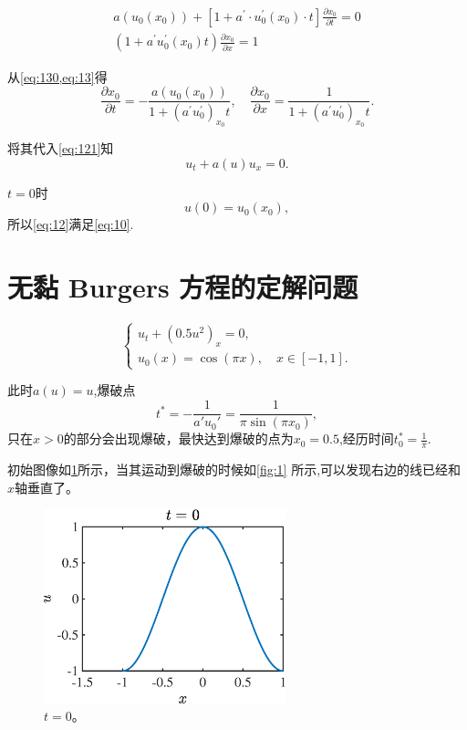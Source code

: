 \documentclass[12pt]{article}
\begin{document}
\begin{gather}
a\left(u_{0}\left(x_{0}\right)\right)+\left[1+a^{\prime} \cdot u_{0}^{\prime}\left(x_{0}\right) \cdot t\right] \frac{\partial x_{0}}{\partial t}=0 
\label{eq:130}
\\
\left(1+a^{\prime} u_{0}^{\prime}\left(x_{0}\right) t\right) \frac{\partial x_{0}}{\partial x}=1
\label{eq:13}
\end{gather}

从\cref{eq:130,eq:13}得
\begin{equation}
	\frac{\partial x_{0}}{\partial t}=-\frac{a\left(u_{0}\left(x_{0}\right)\right)}{1+\left(a^{\prime} u_{0}^{\prime}\right)_{x_{0}} t}, \quad \frac{\partial x_{0}}{\partial x}=\frac{1}{1+\left(a^{\prime} u_{0}^{\prime}\right)_{x_{0}} t}.
\end{equation}

将其代入\cref{eq:121}知
\begin{equation}
	u_{t}+a(u) u_{x}=0.
\end{equation}

$t=0$时
\begin{equation}
	u(0)=u_{0}\left(x_{0}\right),
\end{equation}
所以\cref{eq:12}满足\cref{eq:10}.

\section{无黏 Burgers 方程的定解问题}

\begin{equation}
	\begin{cases}
		u_t+(0.5 u^2)_x=0, \\
		u_0(x) = \cos(\pi x),\quad x \in [-1,1].
	\end{cases}
\end{equation}


此时$a(u)=u$,爆破点
\begin{equation}
	t^* = - \frac{1}{a'u_0'} = \frac{1}{\pi \sin(\pi x_0)},
\end{equation}
只在$x>0$的部分会出现爆破，最快达到爆破的点为$x_0=0.5$,经历时间$t_0^*=\frac{1}{\pi}$.

初始图像如\cref{fig:0}所示，当其运动到爆破的时候如\cref{fig:1} 所示,可以发现右边的线已经和$x$轴垂直了。

\begin{figure}[htp]
	\centering
	\includegraphics[width=7cm]{0.eps}
	\caption{$t=0$。}
	\label{fig:0}
\end{figure}
\end{document}
